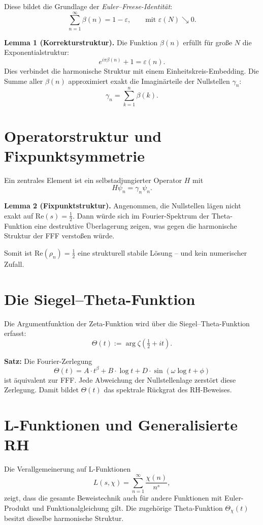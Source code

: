 \documentclass[12pt]{article}
\begin{document}
Diese bildet die Grundlage der \textit{Euler--Freese-Identität}:
\[
\sum_{n=1}^{\infty} \beta(n) = 1 - \varepsilon,
\qquad \text{mit } \varepsilon(N) \searrow 0.
\]

\textbf{Lemma 1 (Korrekturstruktur).}  
Die Funktion $\beta(n)$ erfüllt für große $N$ die Exponentialstruktur:
\[
e^{i\pi \beta(n)} + 1 = \varepsilon(n).
\]
Dies verbindet die harmonische Struktur mit einem Einheitskreis-Embedding. Die Summe aller $\beta(n)$ approximiert exakt die Imaginärteile der Nullstellen $\gamma_n$:
\[
\gamma_n = \sum_{k=1}^{n} \beta(k).
\]

\section{Operatorstruktur und Fixpunktsymmetrie}

Ein zentrales Element ist ein selbstadjungierter Operator $H$ mit
\[
H \psi_n = \gamma_n \psi_n.
\]

\textbf{Lemma 2 (Fixpunktstruktur).}  
Angenommen, die Nullstellen lägen nicht exakt auf $\mathrm{Re}(s) = \tfrac{1}{2}$. Dann würde sich im Fourier-Spektrum der Theta-Funktion eine destruktive Überlagerung zeigen, was gegen die harmonische Struktur der FFF verstoßen würde.

Somit ist $\mathrm{Re}(\rho_n) = \tfrac{1}{2}$ eine strukturell stabile Lösung – und kein numerischer Zufall.

\section{Die Siegel--Theta-Funktion}

Die Argumentfunktion der Zeta-Funktion wird über die Siegel--Theta-Funktion erfasst:
\[
\Theta(t) := \arg \zeta\left(\tfrac{1}{2} + it\right).
\]

\textbf{Satz:} Die Fourier-Zerlegung
\[
\Theta(t) = A \cdot t^\beta + B \cdot \log t + D \cdot \sin(\omega \log t + \phi)
\]
ist äquivalent zur FFF. Jede Abweichung der Nullstellenlage zerstört diese Zerlegung. Damit bildet $\Theta(t)$ das spektrale Rückgrat des RH-Beweises.

\section{L-Funktionen und Generalisierte RH}

Die Verallgemeinerung auf L-Funktionen
\[
L(s, \chi) = \sum_{n=1}^\infty \frac{\chi(n)}{n^s},
\]
zeigt, dass die gesamte Beweistechnik auch für andere Funktionen mit Euler-Produkt und Funktionalgleichung gilt. Die zugehörige Theta-Funktion $\Theta_\chi(t)$ besitzt dieselbe harmonische Struktur.
\end{document}
